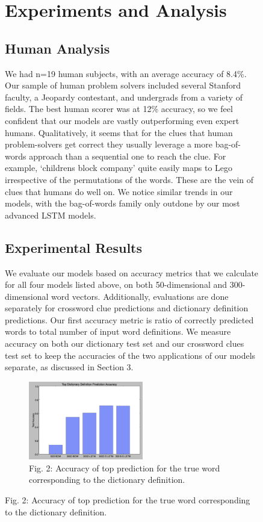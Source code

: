 \documentclass{article} %
\begin{document}
\begin{figure}
\section{Experiments and Analysis}

\subsection{Human Analysis}
We had n=19 human subjects, with an average accuracy of 8.4\%. Our sample of human problem solvers included several Stanford faculty, a Jeopardy contestant, and undergrads from a variety of fields. The best human scorer was at 12\% accuracy, so we feel confident that our models are vastly outperforming even expert humans.
Qualitatively, it seems that for the clues that human problem-solvers get correct they usually leverage a more bag-of-words approach than a sequential one to reach the clue. For example, ‘childrens block company’ quite easily maps to Lego irrespective of the permutations of the words. These are the vein of clues that humans do well on. We notice similar trends in our models, with the bag-of-words family only outdone by our most advanced LSTM models.

\subsection{Experimental Results}
We evaluate our models based on accuracy metrics that we calculate for all four models listed above, on both 50-dimensional and 300-dimensional word vectors. Additionally, evaluations are done separately for crossword clue predictions and dictionary definition predictions.
Our first accuracy metric is ratio of correctly predicted words to total number of input word definitions. We measure accuracy on both our dictionary test set and our crossword clues test set to keep the accuracies of the two applications of our models separate, as discussed in Section 3.

\begin{figure}
    \centering
	\includegraphics[width=50mm]{REAL_topdictdef.png}
	\caption{Fig. 2: Accuracy of top prediction for the true word corresponding to the dictionary definition.}
\end{figure}


\end{figure}
\end{document}
